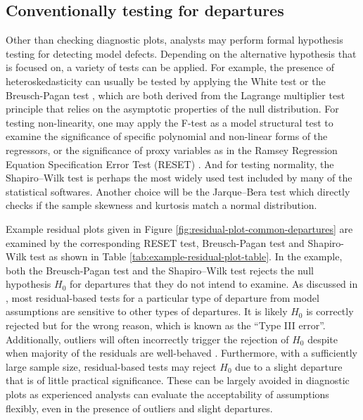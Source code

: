 \documentclass[]{interact}
\theoremstyle{plain}%
\theoremstyle{definition}
\theoremstyle{remark}
\begin{document}
\hypertarget{conventionally-testing-for-departures}{%
\subsection{Conventionally testing for
departures}\label{conventionally-testing-for-departures}}

Other than checking diagnostic plots, analysts may perform formal
hypothesis testing for detecting model defects. Depending on the
alternative hypothesis that is focused on, a variety of tests can be
applied. For example, the presence of heteroskedasticity can usually be
tested by applying the White test
\citep{white_heteroskedasticity-consistent_1980} or the Breusch-Pagan
test \citep{breusch_simple_1979}, which are both derived from the
Lagrange multiplier test \citep{silvey1959lagrangian} principle that
relies on the asymptotic properties of the null distribution. For
testing non-linearity, one may apply the F-test as a model structural
test to examine the significance of specific polynomial and non-linear
forms of the regressors, or the significance of proxy variables as in
the Ramsey Regression Equation Specification Error Test (RESET)
\citep{ramsey_tests_1969}. And for testing normality, the Shapiro--Wilk
test \citep{shapiro1965analysis} is perhaps the most widely used test
included by many of the statistical softwares. Another choice will be
the Jarque--Bera test \citep{jarque1980efficient} which directly checks
if the sample skewness and kurtosis match a normal distribution.

Example residual plots given in Figure
\ref{fig:residual-plot-common-departures} are examined by the
corresponding RESET test, Breusch-Pagan test and Shapiro-Wilk test as
shown in Table \ref{tab:example-residual-plot-table}. In the example,
both the Breusch-Pagan test and the Shapiro--Wilk test rejects the null
hypothesis \(H_0\) for departures that they do not intend to examine. As
discussed in \citet{cook1982residuals}, most residual-based tests for a
particular type of departure from model assumptions are sensitive to
other types of departures. It is likely \(H_0\) is correctly rejected
but for the wrong reason, which is known as the ``Type III error''.
Additionally, outliers will often incorrectly trigger the rejection of
\(H_0\) despite when majority of the residuals are well-behaved
\citep{cook_applied_1999}. Furthermore, with a sufficiently large sample
size, residual-based tests may reject \(H_0\) due to a slight departure
that is of little practical significance. These can be largely avoided
in diagnostic plots as experienced analysts can evaluate the
acceptability of assumptions flexibly, even in the presence of outliers
and slight departures.
\end{document}
